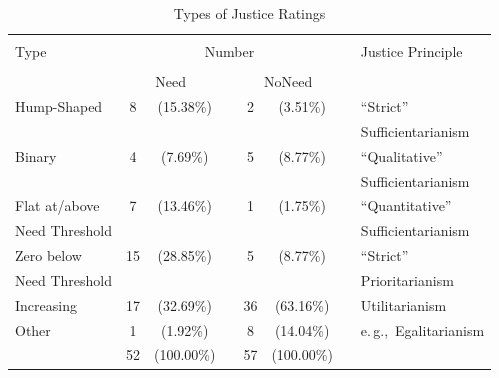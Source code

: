 \documentclass[12pt]{scrartcl}
\begin{document}
\begin{table}[ht!]
   \centering
   \caption{Types of Justice Ratings}\label{tab:individual}
   {\normalsize\small
   \begin{tabular}{lccccccl}\hline\\[-2.5ex]
   Type             & \multicolumn{5}{c}{Number}                                    &   & Justice Principle        \\\cline{2-6}\\[-2.5ex]
                    & \multicolumn{2}{c}{Need}   &   & \multicolumn{2}{c}{NoNeed}   &   &                          \\\hline\hline
   Hump-Shaped      &  8   &  (15.38\%)          &   &  2   &   (3.51\%)            &   & ``Strict''               \\
                    &      &                     &   &      &                       &   & Sufficientarianism       \\[1ex]
   Binary           &  4   &   (7.69\%)          &   &  5   &   (8.77\%)            &   & ``Qualitative''          \\
                    &      &                     &   &      &                       &   & Sufficientarianism       \\[1ex]
   Flat at/above    &  7   &  (13.46\%)          &   &  1   &   (1.75\%)            &   & ``Quantitative''         \\
   Need Threshold   &      &                     &   &      &                       &   & Sufficientarianism       \\[1ex]
   Zero below       & 15   &  (28.85\%)          &   &  5   &   (8.77\%)            &   & ``Strict''               \\
   Need Threshold   &      &                     &   &      &                       &   & Prioritarianism          \\[1ex]
   Increasing       & 17   &  (32.69\%)          &   & 36   &  (63.16\%)            &   & Utilitarianism           \\[1ex]
   Other            &  1   &   (1.92\%)          &   &  8   &  (14.04\%)            &   & e.\,g.,~Egalitarianism   \\[0.5ex]\hline
                    & 52   & (100.00\%)          &   & 57   & (100.00\%)            &   &                          \\\hline
   \end{tabular}
   }
\end{table}
\end{document}
